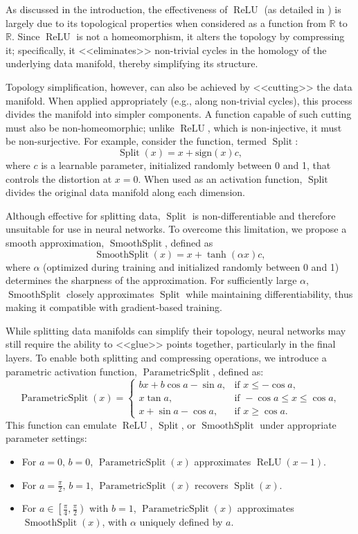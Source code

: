 \documentclass{esannV2}
\DeclareMathOperator{\relu}{\mathrm{ReLU}}
\DeclareMathOperator{\signsplit}{\mathrm{Split}}
\DeclareMathOperator{\smoothsplit}{\mathrm{SmoothSplit}}
\DeclareMathOperator{\parametricsplit}{\mathrm{ParametricSplit}}
\begin{document}
As discussed in the introduction, the effectiveness of \(\relu\) (as detailed in \cite{top_of_DNN}) is largely due to its topological properties when considered as a function from \(\mathbb{R}\) to \(\mathbb{R}\). Since \(\relu\) is not a homeomorphism, it alters the topology by compressing it; specifically, it <<eliminates>> non-trivial cycles in the homology of the underlying data manifold, thereby simplifying its structure.

Topology simplification, however, can also be achieved by <<cutting>> the data manifold. When applied appropriately (e.g., along non-trivial cycles), this process divides the manifold into simpler components. A function capable of such cutting must also be non-homeomorphic; unlike \(\relu\), which is non-injective, it must be non-surjective. For example, consider the function, termed \(\signsplit\):
\[
  \signsplit(x) = x + \mathrm{sign}(x)c,
\]
where \(c\) is a learnable parameter, initialized randomly between 0 and 1, that controls the distortion at \(x = 0\). When used as an activation function, \(\signsplit\) divides the original data manifold along each dimension.

Although effective for splitting data, \(\signsplit\) is non-differentiable and therefore unsuitable for use in neural networks. To overcome this limitation, we propose a smooth approximation, \(\smoothsplit\), defined as
\[
  \smoothsplit(x) = x + \tanh(\alpha x)c,
\]
where \(\alpha\) (optimized during training and initialized randomly between 0 and 1) determines the sharpness of the approximation. For sufficiently large \(\alpha\), \(\smoothsplit\) closely approximates \(\signsplit\) while maintaining differentiability, thus making it compatible with gradient-based training.

While splitting data manifolds can simplify their topology, neural networks may still require the ability to <<glue>> points together, particularly in the final layers. To enable both splitting and compressing operations, we introduce a parametric activation function, \(\parametricsplit\), defined as:
\[
  \parametricsplit(x) =
  \begin{cases}
    bx + b\cos a - \sin a, & \text{if } x \le -\cos a,            \\[1mm]
    x\tan a,               & \text{if } -\cos a \le x \le \cos a, \\[1mm]
    x + \sin a - \cos a,   & \text{if } x \ge \cos a.
  \end{cases}
\]
This function can emulate \(\relu\), \(\signsplit\), or \(\smoothsplit\) under appropriate parameter settings:
\begin{itemize}
  \item For \(a=0,\, b=0\), \(\parametricsplit(x)\) approximates \(\relu(x-1)\).
  \item For \(a=\frac{\pi}{2},\, b=1\), \(\parametricsplit(x)\) recovers \(\signsplit(x)\).
  \item For \(a\in\left[\frac{\pi}{4}, \frac{\pi}{2}\right)\) with \(b=1\), \(\parametricsplit(x)\) approximates \(\smoothsplit(x)\), with \(\alpha\) uniquely defined by \(a\).
\end{itemize}
\end{document}
